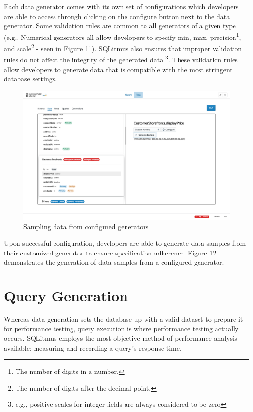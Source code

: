 \documentclass[12pt]{report}
\begin{document}
\begin{spacing}{1.9}
\begin{figure}[H]
		\end{figure}
		
		Each data generator comes with its own set of configurations which developers are able to access through clicking on the configure button next to the data generator. Some validation rules are common to all generators of a given type (e.g., Numerical generators all allow developers to specify min, max, precision\footnote{The number of digits in a number.}, and scale\footnote{The number of digits after the decimal point.} - seen in Figure 11). SQLitmus also ensures that improper validation rules do not affect the integrity of the generated data \footnote{e.g., positive scales for integer fields are always considered to be zero}. These validation rules allow developers to generate data that is compatible with the most stringent database settings.
		
		
		\begin{figure}[H]
			\centering
			\includegraphics[width=\textwidth]{3-2-2d.png}
			\caption{Sampling data from configured generators}
			
		\end{figure}
		
		Upon successful configuration, developers are able to generate data samples from their customized generator to ensure specification adherence. Figure 12 demonstrates the generation of data samples from a configured generator.
		
		\section{Query Generation}
		
		Whereas data generation sets the database up with a valid dataset to prepare it for performance testing, query execution is where performance testing actually occurs. SQLitmus employs the most objective method of performance analysis available: measuring and recording a query's response time.
		

\end{spacing}
\end{document}
